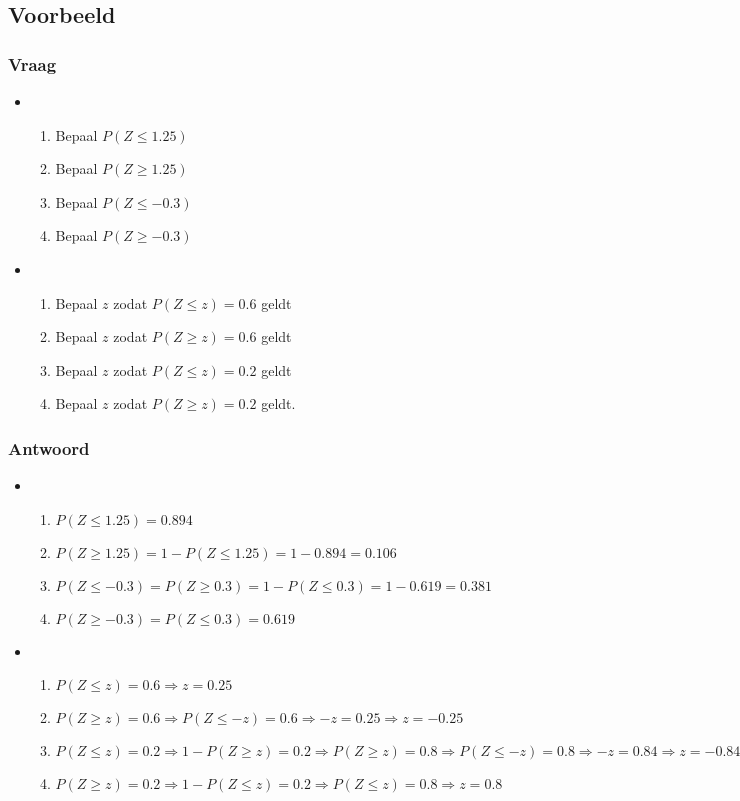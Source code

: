 \documentclass[main.tex]{subfiles}
\begin{document}
\subsection*{Voorbeeld}
\subsubsection*{Vraag}
\begin{itemize}
\item
  \begin{enumerate}
  \item Bepaal $P(Z \le 1.25)$
  \item Bepaal $P(Z \ge 1.25)$
  \item Bepaal $P(Z \le -0.3)$
  \item Bepaal $P(Z \ge -0.3)$
  \end{enumerate}
\item
  \begin{enumerate}
  \item Bepaal $z$ zodat $P(Z \le z) = 0.6$ geldt
  \item Bepaal $z$ zodat $P(Z \ge z) = 0.6$ geldt
  \item Bepaal $z$ zodat $P(Z \le z) = 0.2$ geldt
  \item Bepaal $z$ zodat $P(Z \ge z) = 0.2$ geldt.
  \end{enumerate}
\end{itemize}
\subsubsection*{Antwoord}
\begin{itemize}
\item
  \begin{enumerate}
  \item $P(Z \le 1.25) = 0.894$
  \item $P(Z \ge 1.25) = 1-P(Z \le 1.25) = 1- 0.894 = 0.106$
  \item $P(Z \le -0.3) = P(Z \ge 0.3) = 1- P(Z \le 0.3) = 1-0.619 = 0.381$
  \item $P(Z \ge -0.3) = P(Z \le 0.3) = 0.619$
  \end{enumerate}
\item
  \begin{enumerate}
  \item $P(Z \le z) = 0.6 \Rightarrow z = 0.25$
  \item $P(Z \ge z) = 0.6 \Rightarrow P(Z \le -z) = 0.6 \Rightarrow -z = 0.25 \Rightarrow z = -0.25$ 
  \item $P(Z \le z) = 0.2 \Rightarrow 1-P(Z \ge z) = 0.2 \Rightarrow P(Z \ge z) = 0.8 \Rightarrow P(Z \le -z) = 0.8 \Rightarrow -z = 0.84 \Rightarrow z = -0.84$
  \item $P(Z \ge z) = 0.2 \Rightarrow 1-P(Z \le z) = 0.2 \Rightarrow P(Z \le z) = 0.8 \Rightarrow z = 0.8$
  \end{enumerate}
\end{itemize}
\end{document}
